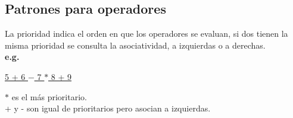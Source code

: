 \documentclass[\main/ApuntesPL.tex]{subfiles}
\begin{document}
    \subsection{Patrones para operadores}
      \par
      La prioridad indica el orden en que los operadores se evaluan, si dos tienen la misma
      prioridad se consulta la asociatividad, a izquierdas o a derechas.\\
      \hspace{3mm}\textbf{e.g.}\\
      \begin{center}
        \begin{minipage}{.3\textwidth}
          \hspace{10mm}\underline{\underline{\underline{5 + 6} $-$ \underline{7 $\ast$ 8}} + 9}
        \end{minipage}%
        \begin{minipage}{.7\textwidth}
          $\ast$ es el más prioritario.\\
          + y - son igual de prioritarios pero asocian a izquierdas.
        \end{minipage}
      \end{center}
\end{document}
